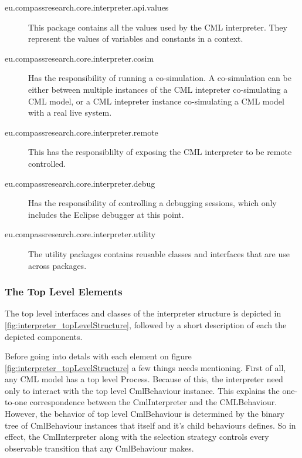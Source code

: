 \documentclass[a4paper, 10pt]{include/compassreport}   %
\begin{document}
\begin{description}
\item[eu.compassresearch.core.interpreter.api.values] This package
  contains all the values used by the CML interpreter. They represent
  the values of variables and constants in a context.

\item[eu.compassresearch.core.interpreter.cosim] Has the responsibility
  of running a co-simulation. A co-simulation can be either between
  multiple instances of the CML intepreter co-simulating a CML model, or
  a CML intepreter instance co-simulating a CML model with a real live
  system.

\item[eu.compassresearch.core.interpreter.remote] This has the
  responsiblilty of exposing the CML interpreter to be remote
  controlled.

\item[eu.compassresearch.core.interpreter.debug] Has the
  responsibility of controlling a debugging sessions, which only
  includes the Eclipse debugger at this point.

\item[eu.compassresearch.core.interpreter.utility] The utility
  packages contains reusable classes and interfaces that are use across
  packages.

\end{description}

\subsubsection*{The Top Level Elements}

The top level interfaces and classes of the interpreter structure is
depicted in \autoref{fig:interpreter_topLevelStructure}, followed by a
short description of each the depicted components.

Before going into detals with each element on figure
\ref{fig:interpreter_topLevelStructure} a few things needs
mentioning. First of all, any CML model has a top level
Process. Because of this, the interpreter need only to interact with
the top level CmlBehaviour instance. This explains the one-to-one
correspondence between the CmlInterpreter and the
CMLBehaviour. However, the behavior of top level CmlBehaviour is
determined by the binary tree of CmlBehaviour instances that itself
and it's child behaviours defines. So in effect, the CmlInterpreter
along with the selection strategy controls every observable transition
that any CmlBehaviour makes.
\end{document}
